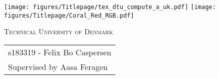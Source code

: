 \begin{titlepage}
\raggedright \texttt{[image: figures/Titlepage/tex\_dtu\_compute\_a\_uk.pdf]} \hspace{5.8 cm}
\texttt{[image: figures/Titlepage/Coral\_Red\_RGB.pdf]}\par
    \centering
    \vspace{0.5 cm}
    {\scshape\LARGE Technical University of Denmark \par}
    \vspace{0.5 cm}
    {\scshape\Large \course \par}
    \begin{figure}[H]
        \centering
    \end{figure}
    {\huge\bfseries \opgavetitel \par}
    \vspace{1 cm}
    {\large
        \begin{tabular}{l}
        s183319 - Felix Bo Caspersen
        \\
        Supervised by Aasa Feragen
        \end{tabular} \\
        \vspace{1 cm}
        \par}
    \vfill
    {\large \datoen \par}
\end{titlepage}